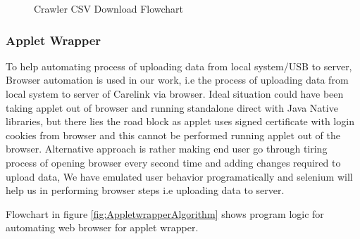 \documentclass[article,type=msc,colorback,accentcolor=tud9c,twoside,11pt]{tudthesis}
\begin{document}
\begin{center}
\begin{figure}[h!]
  \caption{Crawler CSV Download Flowchart}
  \label{fig:CrawlerCSVAlgorithm}
\end{figure}
\end{center}

\subsubsection{Applet Wrapper}
\label{subsec:AppletWrapper}
To help automating process of uploading data from local system/USB to server, Browser automation is used in our work, i.e the process of uploading data from local system to server of Carelink via browser. Ideal situation could have been taking applet out of browser and running standalone direct with Java Native libraries, but there lies the road block as applet uses signed certificate with login cookies from browser and this cannot be performed running applet out of the browser. Alternative approach is rather making end user go through tiring process of opening browser every second time and adding changes required to upload data, We have emulated user behavior programatically and selenium will help us in performing browser steps i.e uploading data to server. 

Flowchart in figure \ref{fig:AppletwrapperAlgorithm} shows  program logic for automating web browser for applet wrapper.
\end{document}
